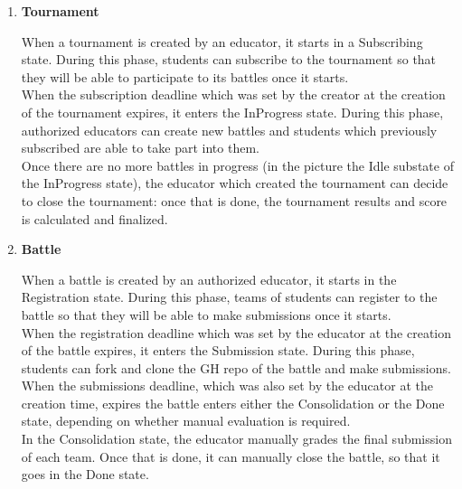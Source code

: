 \begin{enumerate}[label=\textbf{SD\arabic*}:,ref=SD\arabic*,leftmargin=1.3cm]
	\item \textbf{Tournament}
	      \begin{adjustbox}{
			      max size={\textwidth}{},
			      caption={Tournament state diagram},
			      label={fig:Tournament state diagram},
			      figure=H}
		      \centering
	      \end{adjustbox}

	      When a tournament is created by an educator, it starts in a Subscribing state.
	      During this phase, students can subscribe to the tournament so that they will
	      be able to participate to its battles once it starts.\\
	      When the subscription deadline which was set by the creator at the creation of
	      the tournament expires, it enters the InProgress state. During this phase,
	      authorized educators can create new battles and students which previously
	      subscribed are able to take part into them. \\
	      Once there are no more battles in progress (in the picture the Idle substate
	      of the InProgress state), the educator which created the tournament can decide
	      to close the tournament: once that is done, the tournament results and score
	      is calculated and finalized.
	      \pagebreak

	\item \textbf{Battle}
	      \begin{adjustbox}{
			      max size={\textwidth}{\textheightwithcaption{1}},
			      caption={Battle state diagram},
			      label={fig:Battle state diagram},
			      figure=H}
		      \centering
		      \puml{puml/battle-state}
	      \end{adjustbox}

	      When a battle is created by an authorized educator, it starts in the Registration state.
	      During this phase, teams of students can register to the battle so that they will
	      be able to make submissions once it starts.\\
	      When the registration deadline which was set by the educator at the creation of
	      the battle expires, it enters the Submission state. During this phase,
	      students can fork and clone the GH repo of the battle and make submissions. \\
	      When the submissions deadline, which was also set by the educator at the creation time,
	      expires the battle enters either the Consolidation or the Done state, depending on
	      whether manual evaluation is required. \\
	      In the Consolidation state, the educator manually grades the final submission of each
	      team. Once that is done, it can manually close the battle, so that it goes in the
	      Done state.
\end{enumerate}
\pagebreak

